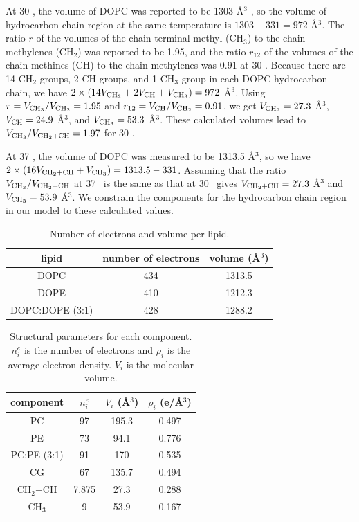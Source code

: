 At 30 \textcelsius, the volume of DOPC was reported to be 1303 \AA$^3$ \cite{Kucerka08}, 
so the volume of hydrocarbon chain region at the same temperature is 
$1303 - 331 = 972$ \AA$^3$. The ratio $r$ of the volumes
of the chain terminal methyl (CH$_3$) to the chain methylenes (CH$_2$) was 
reported to be 1.95, and the ratio $r_{12}$ of the volumes of the chain
methines (CH) to the chain methylenes was 0.91 at 30 \textcelsius. 
Because there are 14 CH$_2$ groups,
2 CH groups, and 1 CH$_3$ group in each DOPC hydrocarbon chain, we have
$2\times(14V_{\textrm{CH}_2}+2V_\textrm{CH}+V_{\textrm{CH}_3})=972$ \AA$^3$. 
Using $r=V_{\textrm{CH}_3}/V_{\textrm{CH}_2}=1.95$ 
and $r_{12}=V_\textrm{CH}/V_{\textrm{CH}_2}=0.91$, we get $V_{\textrm{CH}_2}=27.3$ \AA$^3$, 
$V_\textrm{CH}=24.9$ \AA$^3$, and $V_{\textrm{CH}_3}=53.3$ \AA$^3$. 
These calculated volumes lead to $V_{\textrm{CH}_3}/V_{\textrm{CH}_2+\textrm{CH}}=1.97$  for 30 \textcelsius. 

At 37 \textcelsius, the volume of DOPC was measured to be 1313.5 \AA$^3$, so
we have $2\times(16V_{\textrm{CH}_2+\textrm{CH}}+V_{\textrm{CH}_3})=1313.5-331$. Assuming that the ratio 
$V_{\textrm{CH}_3}/V_{\textrm{CH}_2+\textrm{CH}}$ at 37 \textcelsius\ is the same as that at 30 \textcelsius\ 
gives $V_{\textrm{CH}_2+\textrm{CH}}=27.3$ \AA$^3$ and $V_{\textrm{CH}_3}=53.9$ \AA$^3$. We constrain
the components for the hydrocarbon chain region in our model 
to these calculated values.

\begin{table}[htbp]
  \centering
  \begin{tabular}{ccc}
    \hline
    lipid & number of electrons & volume (\AA$^3$) \\
    \hline
    DOPC & 434 & 1313.5 \\
    DOPE & 410 & 1212.3 \\
    DOPC:DOPE (3:1) & 428 & 1288.2 \\
    \hline
  \end{tabular}
  \caption[Number of electrons and volume per lipid]
  {Number of electrons and volume per lipid.}
  \label{tab:electron_volume}
\end{table}

\begin{table}[htbp]
  \centering
  \begin{tabular}{cccc}
    \hline
    component & $n^e_i$ & $V_i$ (\AA$^3$) & $\rho_i$ (e/\AA$^3$) \\
    \hline 
    PC & 97 & 195.3 & 0.497 \\  
    PE & 73 & 94.1  & 0.776 \\
    PC:PE (3:1) & 91 & 170 & 0.535 \\
    CG & 67 & 135.7 & 0.494 \\  
    CH$_2$+CH & 7.875 & 27.3 & 0.288 \\
    CH$_3$ & 9 & 53.9 & 0.167 \\
    \hline
  \end{tabular}
  \caption[Structural parameters for each component]
  {Structural parameters for each component.   $n^e_i$ is the number of 
  electrons and $\rho_i$ is the average electron density. $V_i$ is the 
  molecular volume.}
  \label{tab:component}
\end{table}

